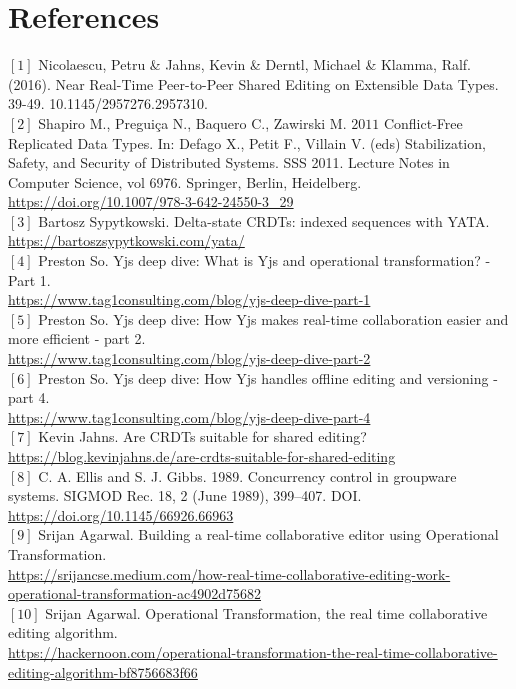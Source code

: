 \documentclass[9pt, titlepage]{article}
\begin{document}
  \section{References}
  \([1]\) Nicolaescu, Petru \& Jahns, Kevin \& Derntl, Michael \& Klamma, Ralf. (2016). Near Real-Time Peer-to-Peer Shared Editing on Extensible Data Types. 39-49. 10.1145/2957276.2957310.
  \\
  \([2]\) Shapiro M., Preguiça N., Baquero C., Zawirski M. \(2011\) Conflict-Free Replicated Data Types. In: Defago X., Petit F., Villain V. (eds) Stabilization, Safety, and Security of Distributed Systems. SSS 2011. Lecture Notes in Computer Science, vol 6976. Springer, Berlin, Heidelberg. 
  \\ \url{https://doi.org/10.1007/978-3-642-24550-3_29}
  \\
  \([3]\) Bartosz Sypytkowski. Delta-state CRDTs: indexed sequences with YATA. 
  \\ \url{https://bartoszsypytkowski.com/yata/}
  \\
  \([4]\) Preston So. Yjs deep dive: What is Yjs and operational transformation? - Part 1. \\ \url{https://www.tag1consulting.com/blog/yjs-deep-dive-part-1}
  \\
  \([5]\) Preston So. Yjs deep dive: How Yjs makes real-time collaboration easier and more efficient - part 2. \\ \url{https://www.tag1consulting.com/blog/yjs-deep-dive-part-2}
  \\
  \([6]\) Preston So. Yjs deep dive: How Yjs handles offline editing and versioning - part 4. \\ \url{https://www.tag1consulting.com/blog/yjs-deep-dive-part-4}
  \\
  \([7]\) Kevin Jahns. Are CRDTs suitable for shared editing?\\
  \url{https://blog.kevinjahns.de/are-crdts-suitable-for-shared-editing}
  \\
  \([8]\) C. A. Ellis and S. J. Gibbs. 1989. Concurrency control in groupware systems. SIGMOD Rec. 18, 2 (June 1989), 399–407. DOI. \\
  \url{https://doi.org/10.1145/66926.66963}
  \\
  \([9]\) Srijan Agarwal. Building a real-time collaborative editor using Operational Transformation. \\
  \url{https://srijancse.medium.com/how-real-time-collaborative-editing-work-operational-transformation-ac4902d75682}
  \\
  \([10]\) Srijan Agarwal. Operational Transformation, the real time collaborative editing algorithm. \\
  \url{https://hackernoon.com/operational-transformation-the-real-time-collaborative-editing-algorithm-bf8756683f66}
\end{document}
